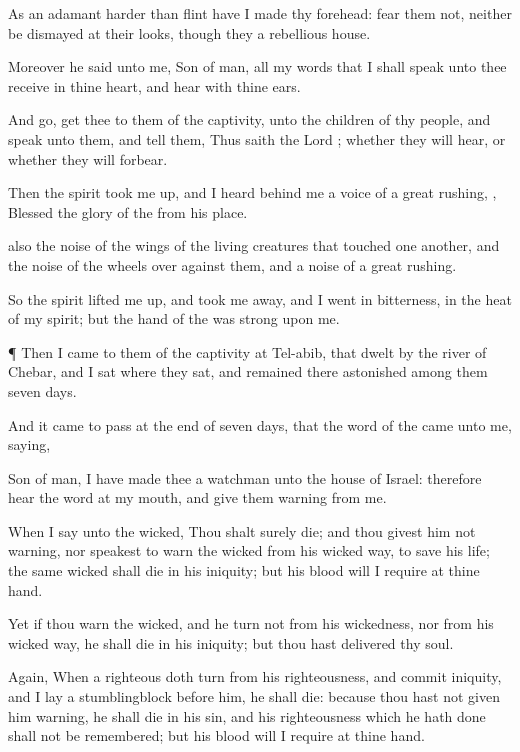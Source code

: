 {As an
adamant
harder than
flint have I
made thy
forehead:
fear them not, neither be
dismayed at their
looks, though they
{} a
rebellious
house.

Moreover he
said unto me,
Son of
man, all my
words that I shall
speak unto thee
receive in thine
heart, and
hear with thine
ears.

And
go,
get thee to them of the
captivity, unto the
children of thy
people, and
speak unto them, and
tell them, Thus
saith the
Lord
{}; whether they will
hear, or whether they will
forbear.

Then the
spirit took me
up, and I
heard
behind me a
voice of a
great
rushing,
{},
Blessed
{} the
glory of the
{} from his
place.

 also the
noise of the
wings of the living
creatures that
touched
one
another, and the
noise of the
wheels over
against them, and a
noise of a
great
rushing.

So the
spirit lifted me
up, and took me
away, and I
went in
bitterness, in the
heat of my
spirit; but the
hand of the
{} was
strong upon me.


\par }{\PP {}¶ Then I
came to them of the
captivity at
Tel-abib, that
dwelt by the
river of
Chebar, and I
sat where they
sat, and
remained there
astonished
among them
seven
days.


\par }{\PP {}And it came to pass at the
end of
seven
days, that the
word of the
{} came unto me,
saying,

Son of
man, I have
made thee a
watchman unto the
house of
Israel: therefore
hear the
word at my
mouth, and give them
warning from me.

When I
say unto the
wicked, Thou shalt
surely
die; and thou givest him not
warning, nor
speakest to
warn the
wicked from his
wicked
way, to save his
life; the same
wicked
{} shall
die in his
iniquity; but his
blood will I
require at thine
hand.

Yet if thou
warn the
wicked, and he
turn not from his
wickedness, nor from his
wicked
way, he shall
die in his
iniquity; but thou hast
delivered thy
soul.

Again, When a
righteous
{} doth
turn from his
righteousness, and
commit
iniquity, and I
lay a
stumblingblock
before him, he shall
die: because thou hast not given him
warning, he shall
die in his
sin, and his
righteousness which he hath
done shall not be
remembered; but his
blood will I
require at thine
hand.

}
